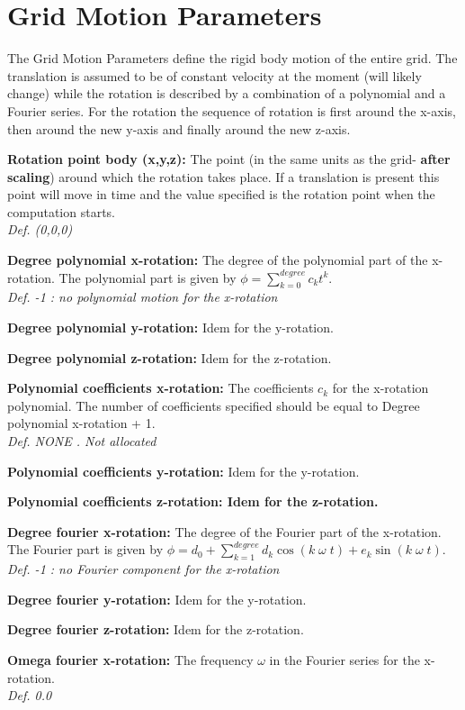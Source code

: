 \documentclass[12pt,epsf,colordvi]{article}
\begin{document}
\section{Grid Motion Parameters}
%
The Grid Motion Parameters define the rigid body motion of the entire grid. The translation is assumed to be of constant velocity at the moment (will likely change) while the rotation is described by a combination of a polynomial and a Fourier series. For the rotation the sequence of rotation is first around the x-axis, then around the new y-axis and finally around the new z-axis.
%
\begin{description}
%
	\item{\bf  Rotation point body (x,y,z): } The point (in the same units as the grid- {\bf after scaling}) around which the rotation takes place. If a translation is present this point will move in time and the value specified is the rotation point when the computation starts. \\
{\it Def.   (0,0,0)}
%
	\item{\bf Degree polynomial x-rotation: } The degree of the polynomial part of the x-rotation. The polynomial part is given by \(\phi = \sum _{k=0} ^{degree} c_k t^k\). \\
{\it Def.  -1 : no polynomial motion for the x-rotation}
%
	\item{\bf  Degree polynomial y-rotation: } Idem for the y-rotation.
%
	\item{\bf  Degree polynomial z-rotation: }Idem for the z-rotation.
%
	\item{\bf  Polynomial coefficients x-rotation:} The coefficients \(c_k\) for the x-rotation polynomial. The number of coefficients specified should be equal to Degree polynomial x-rotation + 1. \\
{\it Def. NONE . Not allocated}
%
	\item{\bf Polynomial coefficients y-rotation:}  Idem for the y-rotation.
%
	\item{\bf Polynomial coefficients z-rotation: Idem for the z-rotation. }
%
	\item{\bf Degree fourier x-rotation:} The degree of the Fourier part of the x-rotation. The Fourier part is given by \(\phi = d_0 + \sum _{k=1} ^{degree} d_k \cos(k\; \omega\; t) + e_k \sin(k\; \omega\; t)\). \\
{\it Def.  -1  :  no Fourier component for the x-rotation}
%
	\item{\bf Degree fourier y-rotation: } Idem for the y-rotation.
%
	\item{\bf Degree fourier z-rotation:} Idem for the z-rotation.
%
	\item{\bf  Omega fourier x-rotation:} The frequency \(\omega\) in the Fourier series for the x-rotation. \\
{\it Def.  0.0}


\end{description}
\end{document}
